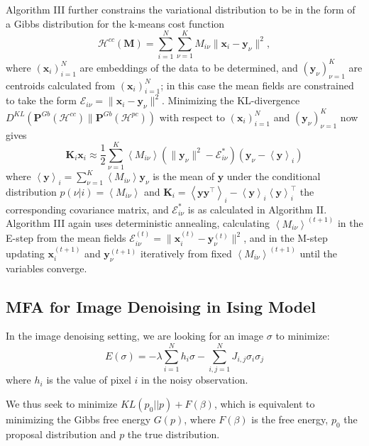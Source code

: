 \documentclass[9pt,parskip]{scrartcl}
\begin{document}
\begin{multicols*}{4}
Algorithm III further constrains the variational distribution to be in the form of a Gibbs distribution for the k-means cost function $$\mathcal{H}^{cc}(\mathbf{M}) = \sum_{i=1}^N \sum_{\nu=1}^K M_{i\nu} \|\mathbf{x}_i-\mathbf{y}_\nu\|^2,$$ where $(\mathbf{x}_i)_{i=1}^N$ are embeddings of the data to be determined, and $(\mathbf{y}_\nu)_{\nu=1}^K$ are centroids calculated from $(\mathbf{x}_i)_{i=1}^N$; in this case the mean fields are constrained to take the form $\mathcal{E}_{i\nu} = \|\mathbf{x}_i - \mathbf{y}_\nu\|^2$. Minimizing the KL-divergence $D^{KL}(\mathbf{P}^{Gb}(\mathcal{H}^{cc})\|\mathbf{P}^{Gb}(\mathcal{H}^{pc}))$ with respect to $(\mathbf{x}_i)_{i=1}^N$ and $(\mathbf{y}_\nu)_{\nu=1}^K$ now gives
$$\mathbf{K}_i \mathbf{x}_i \approx \frac{1}{2} \sum_{\nu=1}^K \left\langle M_{i\nu} \right\rangle \left(\|\mathbf{y}_\nu\|^2 - \mathcal{E}^*_{i\nu}\right)\left(\mathbf{y}_\nu - \left\langle \mathbf{y} \right\rangle_i \right)$$
where $\left\langle \mathbf{y} \right\rangle_i = \sum_{\nu=1}^K \left\langle M_{i\nu} \right\rangle \mathbf{y}_\nu$ is the mean of $\mathbf{y}$ under the conditional distribution $p(\nu|i) = \left\langle M_{i\nu} \right\rangle$ and $\mathbf{K}_i = \left\langle \mathbf{y} \mathbf{y}^\top \right\rangle_i - \left\langle \mathbf{y} \right\rangle_i \left\langle \mathbf{y} \right\rangle_i^\top$ the corresponding covariance matrix, and $\mathcal{E}^*_{i\nu}$ is as calculated in Algorithm II.  Algorithm III again uses deterministic annealing, calculating $\left\langle M_{i\nu} \right\rangle^{(t+1)}$ in the E-step from the mean fields $\mathcal{E}^{(t)}_{i\nu} = \|\mathbf{x}^{(t)}_i - \mathbf{y}^{(t)}_\nu\|^2$, and in the M-step updating $\mathbf{x}^{(t+1)}_i$ and $\mathbf{y}^{(t+1)}_\nu$ iteratively from fixed $\left\langle M_{i\nu} \right\rangle^{(t+1)}$ until the variables converge.

\subsection*{MFA for Image Denoising in Ising Model}

In the image denoising setting, we are looking for an image $\sigma$ to minimize:
    $$E(\sigma) = -\lambda \sum_{i=1}^N h_i\sigma - \sum_{i,j = 1}^N J_{i,j} \sigma_i \sigma_j$$
where $h_i$ is the value of pixel $i$ in the noisy observation.
    
 We thus seek to minimize $KL(p_0 || p) + F(\beta)$, which is equivalent to minimizing the Gibbs free energy $G(p)$, where $F(\beta)$ is the free energy, $p_0$ the proposal distribution and $p$ the true distribution.
 

\end{multicols*}
\end{document}
